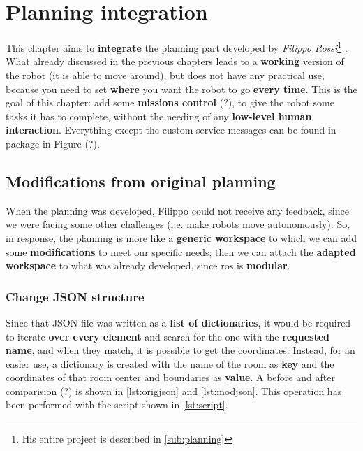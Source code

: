 \chapter{Planning integration}

This chapter aims to \textbf{integrate} the planning part developed by \textit{Filippo Rossi}\footnote{His entire project is described in \autoref{sub:planning}} \cite{fr}. What already discussed in the previous chapters leads to a \textbf{working} version of the robot (it is able to move around), but does not have any practical use, because you need to set \textbf{where} you want the robot to go \textbf{every time}. This is the goal of this chapter: add some \textbf{missions control} (?), to give the robot some tasks it has to complete, without the needing of any \textbf{low-level human interaction}. Everything except the custom service messages can be found in  package in Figure (?).

\section{Modifications from original planning}

When the planning was developed, Filippo could not receive any feedback, since we were facing some other challenges (i.e. make robots move autonomously). So, in response, the planning is more like a \textbf{generic workspace} to which we can add some \textbf{modifications} to meet our specific needs; then we can attach the \textbf{adapted workspace} to what was already developed, since \acrshort{ros} is \textbf{modular}.


\subsection*{Change JSON structure}
\label{sub:json}

Since that JSON file was written as a \textbf{list of dictionaries}, it would be required to iterate \textbf{over every element} and search for the one with the \textbf{requested name}, and when they match, it is possible to get the coordinates. Instead, for an easier use, a dictionary is created with the name of the room as \textbf{key} and the coordinates of that room center and boundaries as \textbf{value}. A before and after comparision (?) is shown in \autoref{lst:origjson} and \autoref{lst:modjson}. This operation has been performed with the  script shown in \autoref{lst:script}.

